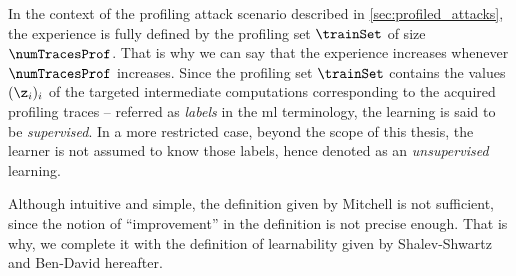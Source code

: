 In the context of the profiling attack scenario described in \autoref{sec:profiled_attacks}, the experience is fully defined by the profiling set \(\trainSet\) of size \(\numTracesProf\).
That is why we can say that the experience increases whenever \(\numTracesProf\) increases.
Since the profiling set \(\trainSet\) contains the values \((\z_i)_i\) of the targeted intermediate computations corresponding to the acquired profiling traces -- referred as \emph{labels} in the \gls{ml} terminology, the learning is said to be \emph{supervised}.
In a more restricted case, beyond the scope of this thesis, the learner is not assumed to know those labels, hence denoted as an \emph{unsupervised} learning.

Although intuitive and simple, the definition given by Mitchell is not sufficient, since the notion of ``improvement'' in the definition is not precise enough.
That is why, we complete it with the definition of learnability given by Shalev-Shwartz and Ben-David hereafter.

